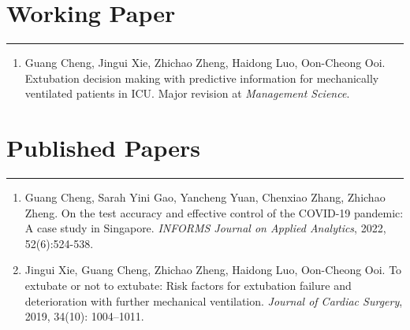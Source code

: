 \documentclass[12pt, a4paper]{article}
\begin{document}
{%

\section*{Working Paper}
\vspace*{0.4em}
\hrule height 0.5pt
\begin{enumerate}[leftmargin=28pt, itemsep=6pt, parsep=0.2pt, topsep=1pt]

	\item Guang Cheng, Jingui Xie, Zhichao Zheng, Haidong Luo, Oon-Cheong Ooi.
	Extubation decision making with predictive information for mechanically ventilated patients in ICU.
	Major revision at {\it Management Science}.


\end{enumerate}




\section*{Published Papers}
\vspace*{0.4em}
\hrule height 0.5pt
\begin{enumerate}[leftmargin=28pt, itemsep=6pt, parsep=0.2pt, topsep=1pt]

	\item Guang Cheng, Sarah Yini Gao, Yancheng Yuan, Chenxiao Zhang, Zhichao Zheng. 
	On the test accuracy and effective control of the COVID-19 pandemic: A case study in Singapore. 
	{\it INFORMS Journal on Applied Analytics}, 2022, 52(6):524-538.

	\item Jingui Xie, Guang Cheng, Zhichao Zheng, Haidong Luo, Oon-Cheong Ooi. 
	To extubate or not to extubate: Risk factors for extubation failure and deterioration with further mechanical ventilation. 
	{\it Journal of Cardiac Surgery}, 2019, 34(10): 1004–1011. 


\end{enumerate}}
\end{document}
